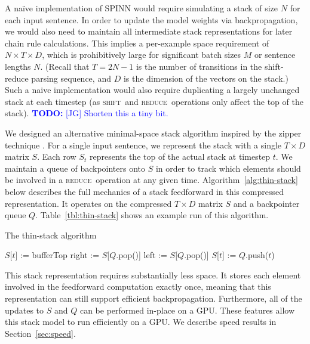 \documentclass[11pt]{article}
\newcommand\todo[1]{\textcolor{blue}{\textbf{TODO:} #1}}
\newcommand{\shift}{\textsc{shift}}
\newcommand{\reduce}{\textsc{reduce}}
\begin{document}
A na\"ive implementation of SPINN would require simulating a stack of size $N$ for each input sentence. In order to update the model weights via backpropagation, we would also need to maintain all intermediate stack representations for later chain rule calculations. This implies a per-example space requirement of $N \times T \times D$, which is prohibitively large for significant batch sizes $M$ or sentence lengths $N$. (Recall that $T = 2N - 1$ is the number of transitions in the shift-reduce parsing sequence, and $D$ is the dimension of the vectors on the stack.) Such a naive implementation would also require duplicating a largely unchanged stack at each timestep (as \shift~and \reduce~operations only affect the top of the stack). \todo{[JG] Shorten this a tiny bit.}

We designed an alternative minimal-space stack algorithm inspired by the zipper technique \citep{huet1997zipper}. For a single input sentence, we represent the stack with a single $T \times D$ matrix $S$. Each row $S_t$ represents the top of the actual stack at timestep $t$. We maintain a queue of backpointers onto $S$ in order to track which elements should be involved in a \reduce~operation at any given time. Algorithm~\ref{alg:thin-stack} below describes the full mechanics of a stack feedforward in this compressed representation. It operates on the compressed $T \times D$ matrix $S$ and a backpointer queue $Q$. Table~\ref{tbl:thin-stack} shows an example run of this algorithm.

\begin{algorithm}[t]
\caption{The thin-stack algorithm}
\label{alg:thin-stack}
\begin{algorithmic}[1]
    \If{op = \shift}
      \State $S$[$t$] := bufferTop
    \ElsIf{op = \reduce}
      \State right := $S$[$Q$.pop()]
      \State left := $S$[$Q$.pop()]
      \State $S$[$t$] := 
    \EndIf
    \State $Q$.push($t$)
  \EndFunction
\end{algorithmic}
\end{algorithm}

This stack representation requires substantially less space. It stores each element involved in the feedforward computation exactly once, meaning that this representation can still support efficient backpropagation. Furthermore, all of the updates to $S$ and $Q$ can be performed in-place on a GPU. These features allow this stack model to run efficiently on a GPU. We describe speed results in Section~\ref{sec:speed}.
\end{document}

